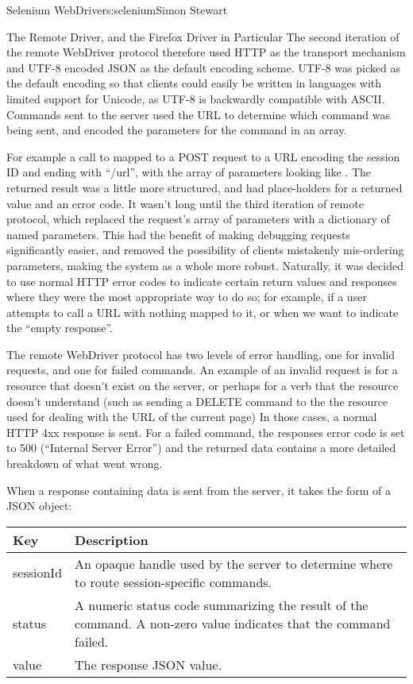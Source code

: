 \begin{aosachapter}{Selenium WebDriver}{s:selenium}{Simon Stewart}
\begin{aosasect1}{The Remote Driver, and the Firefox Driver in Particular}
The second iteration of the remote WebDriver protocol therefore used
HTTP as the transport mechanism and UTF-8 encoded JSON as the default
encoding scheme. UTF-8 was picked as the default encoding so that
clients could easily be written in languages with limited support for
Unicode, as UTF-8 is backwardly compatible with ASCII\@. Commands sent
to the server used the URL to determine which command was being sent,
and encoded the parameters for the command in an array.

For example a call to 
mapped to a POST request to a URL encoding the session ID and ending
with ``/url'', with the array of parameters looking like
.  The returned result was a
little more structured, and had place-holders for a returned value and
an error code.  It wasn't long until the third iteration of remote
protocol, which replaced the request's array of parameters with a
dictionary of named parameters. This had the benefit of making
debugging requests significantly easier, and removed the possibility
of clients mistakenly mis-ordering parameters, making the system as a
whole more robust.  Naturally, it was decided to use normal HTTP error
codes to indicate certain return values and responses where they were
the most appropriate way to do so; for example, if a user attempts to
call a URL with nothing mapped to it, or when we want to indicate the
``empty response''.

The remote WebDriver protocol has two levels of error handling, one
for invalid requests, and one for failed commands. An example of an
invalid request is for a resource that doesn't exist on the server, or
perhaps for a verb that the resource doesn't understand (such as
sending a DELETE command to the the resource used for dealing with the
URL of the current page) In those cases, a normal HTTP 4xx response is
sent. For a failed command, the responses error code is set to 500
(``Internal Server Error'') and the returned data contains a more
detailed breakdown of what went wrong.

When a response containing data is sent from the server, it takes the
form of a JSON object:\\

\begin{tabular}{|lp{4in}|}
\hline
Key & Description \\
\hline
sessionId & An opaque handle used by the server to determine where to route session-specific commands. \\
status & A numeric status code summarizing the result of the command. A non-zero value indicates that the command failed. \\
value & The response JSON value. \\
\hline
\end{tabular}


\end{aosasect1}
\end{aosachapter}
